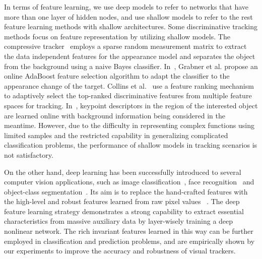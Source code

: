 \documentclass[preprint,12pt,review]{elsarticle}
\begin{document}
In terms of feature learning, we use deep models to refer to networks that have more than one layer of hidden nodes, and use shallow models to refer to the rest feature learning methods with shallow architectures.
%
Some discriminative tracking methods focus on feature representation by utilizing shallow models.
%
The compressive tracker~\cite{zhang2012real} employs a sparse random measurement matrix to extract the data independent features for the appearance model and separates the object from the background using a naive Bayes classifier.
%
In~\cite{grabner2006real}, Grabner et al. propose an online AdaBoost feature selection algorithm to adapt the classifier to the appearance change of the target.
%
Collins et al.~\cite{collins2005online} use a feature ranking mechanism to adaptively select the top-ranked discriminative features from multiple feature spaces for tracking.
%
In~\cite{grabner2007learning}, keypoint descriptors in the region of the interested object are learned online with background information being considered in the meantime.
%
%
%
However, due to the difficulty in representing complex functions using limited samples and the restricted capability in generalizing complicated classification problems, the performance of shallow models in tracking scenarios is not satisfactory.

On the other hand, deep learning has been successfully introduced to several computer vision applications, such as image classification~\cite{krizhevsky2012imagenet}, face recognition~\cite{sun2013hybrid} and object-class segmentation~\cite{schulz2012learning}.
%
Its aim is to replace the hand-crafted features with the high-level and robust features learned from raw pixel values ~\cite{zhuang2016fast,  hinton2006reducing, le2013building, coates2012emergence, marc2007sparse}.
%
The deep feature learning strategy demonstrates a strong capability to extract essential characteristics from massive  auxiliary data by layer-wisely training a deep nonlinear network.
%
The rich invariant features learned in this way can be further employed in classification and prediction problems, and are empirically shown by our experiments to improve the accuracy and robustness of visual trackers.
%
\end{document}
